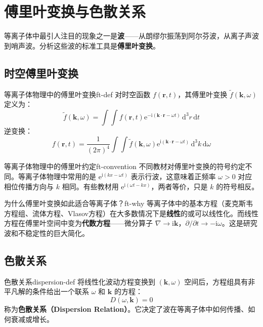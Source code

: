 \documentclass[12pt,a4paper,openany,oneside]{book}
\newcommand{\diff}{\mathrm{d}}
\newcommand{\ii}{\mathrm{i}}
\newcommand{\ee}{\mathrm{e}}
\newcommand{\vect}[1]{\bm{#1}}
\newcommand{\grad}{\nabla}
\newcommand{\difficulty}[1]{\marginnote{\textcolor{red}{\textbf{[#1]}}}}
\begin{document}
\section{傅里叶变换与色散关系}\difficulty{基础}

等离子体中最引人注目的现象之一是\textbf{波}——从朗缪尔振荡到阿尔芬波，从离子声波到哨声波。分析这些波的标准工具是\textbf{傅里叶变换}。

\subsection{时空傅里叶变换}

\begin{definition}{等离子体物理中的傅里叶变换}{ft-def}
对时空函数 $f(\vect{r},t)$，其傅里叶变换 $\tilde{f}(\vect{k},\omega)$ 定义为：
\[
\tilde{f}(\vect{k},\omega) = \int\int f(\vect{r},t) \ee^{-\ii(\vect{k}\cdot\vect{r} - \omega t)}\,\diff^3r\,\diff t
\]
逆变换：
\[
f(\vect{r},t) = \frac{1}{(2\pi)^4} \int\int \tilde{f}(\vect{k},\omega) \ee^{\ii(\vect{k}\cdot\vect{r} - \omega t)}\,\diff^3k\,\diff\omega
\]
\end{definition}

\begin{tip}{等离子体物理中的傅里叶约定}{ft-convention}
不同教材对傅里叶变换的符号约定不同。等离子体物理中常用的是 $\ee^{\ii(kx-\omega t)}$ 表示行波，这意味着正频率 $\omega>0$ 对应相位传播方向与 $k$ 相同。有些教材用 $\ee^{\ii(\omega t - kx)}$，两者等价，只是 $k$ 的符号相反。
\end{tip}

\begin{insight}{为什么傅里叶变换如此适合等离子体？}{ft-why}
等离子体中的基本方程（麦克斯韦方程组、流体方程、Vlasov方程）在大多数情况下是\textbf{线性}的或可以线性化。而线性方程在傅里叶空间中变为\textbf{代数方程}——微分算子 $\grad \to \ii\vect{k}$，$\partial/\partial t \to -\ii\omega$。这是研究波和不稳定性的巨大简化。
\end{insight}

\subsection{色散关系}

\begin{definition}{色散关系}{dispersion-def}
将线性化波动方程变换到 $(\vect{k},\omega)$ 空间后，方程组具有非平凡解的条件给出一个联系 $\omega$ 和 $\vect{k}$ 的方程：
\[
D(\omega, \vect{k}) = 0
\]
称为\textbf{色散关系（Dispersion Relation）}。它决定了波在等离子体中如何传播、如何衰减或增长。
\end{definition}
\end{document}
